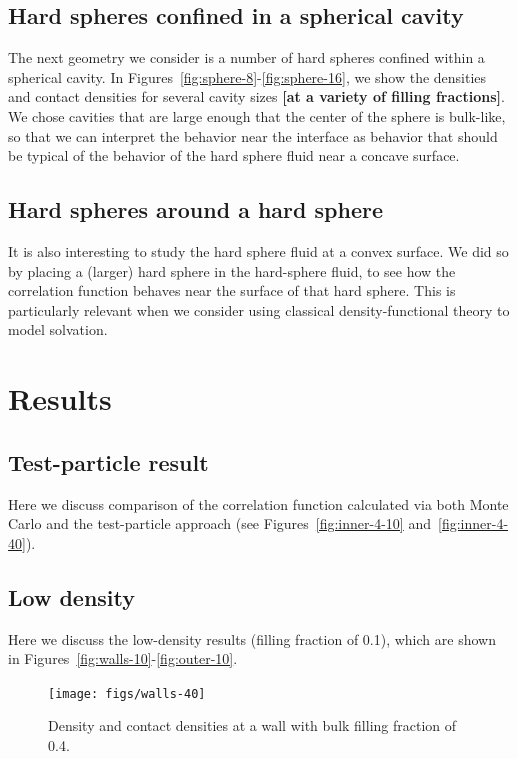 \documentclass[letterpaper,twocolumn,amsmath,amssymb,jcp,10pt,aip]{revtex4-1}
\newcommand{\red}[1]{{\bf \color{red} #1}}
\newcommand{\fixme}[1]{\red{[#1]}}
\begin{document}
\subsection{Hard spheres confined in a spherical cavity}

The next geometry we consider is a number of hard spheres confined
within a spherical cavity.  In
Figures~\ref{fig:sphere-8}-\ref{fig:sphere-16}, we show the densities
and contact densities for several cavity sizes \fixme{at a variety of
  filling fractions}.  We chose cavities that are large enough that
the center of the sphere is bulk-like, so that we can interpret the
behavior near the interface as behavior that should be typical of the
behavior of the hard sphere fluid near a concave surface.

\subsection{Hard spheres around a hard sphere}

It is also interesting to study the hard sphere fluid at a convex
surface.  We did so by placing a (larger) hard sphere in the
hard-sphere fluid, to see how the correlation function behaves near
the surface of that hard sphere.  This is particularly relevant when
we consider using classical density-functional theory to model
solvation.

\section{Results}

\subsection{Test-particle result}

Here we discuss comparison of the correlation function calculated via
both Monte Carlo and the test-particle approach (see
Figures~\ref{fig:inner-4-10} and~\ref{fig:inner-4-40}).

\subsection{Low density}

Here we discuss the low-density results (filling fraction of 0.1),
which are shown in Figures~\ref{fig:walls-10}-\ref{fig:outer-10}.

\begin{figure}
  \texttt{[image: figs/walls-40]}
  \caption{Density and contact densities at a wall with bulk filling
    fraction of 0.4.}
  \label{fig:walls-40}
\end{figure}
\end{document}
